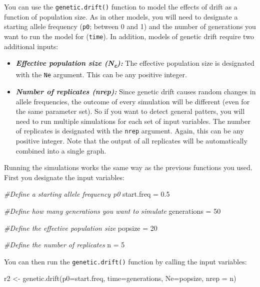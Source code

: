 \documentclass[
]{book}
\newenvironment{Shaded}{\begin{snugshade}}{\end{snugshade}}
\newcommand{\AttributeTok}[1]{\textcolor[rgb]{0.77,0.63,0.00}{#1}}
\newcommand{\CommentTok}[1]{\textcolor[rgb]{0.56,0.35,0.01}{\textit{#1}}}
\newcommand{\DecValTok}[1]{\textcolor[rgb]{0.00,0.00,0.81}{#1}}
\newcommand{\FloatTok}[1]{\textcolor[rgb]{0.00,0.00,0.81}{#1}}
\newcommand{\FunctionTok}[1]{\textcolor[rgb]{0.00,0.00,0.00}{#1}}
\newcommand{\NormalTok}[1]{#1}
\newcommand{\OtherTok}[1]{\textcolor[rgb]{0.56,0.35,0.01}{#1}}
\begin{document}
You can use the \texttt{genetic.drift()} function to model the effects of drift as a function of population size. As in other models, you will need to designate a starting allele frequency (\texttt{p0}; between 0 and 1) and the number of generations you want to run the model for (\texttt{time}). In addition, models of genetic drift require two additional inputs:

\begin{itemize}
\item
  \textbf{\emph{Effective population size (N\textsubscript{e}):}} The effective population size is designated with the \texttt{Ne} argument. This can be any positive integer.
\item
  \textbf{\emph{Number of replicates (nrep):}} Since genetic drift causes random changes in allele frequencies, the outcome of every simulation will be different (even for the same parameter set). So if you want to detect general patters, you will need to run multiple simulations for each set of input variables. The number of replicates is designated with the \texttt{nrep} argument. Again, this can be any positive integer. Note that the output of all replicates will be automatically combined into a single graph.
\end{itemize}

Running the simulations works the same way as the previous functions you used. First you designate the input variables:

\begin{Shaded}
\begin{Highlighting}[]
\CommentTok{\#Define a starting allele frequency p0}
\NormalTok{start.freq }\OtherTok{=} \FloatTok{0.5}

\CommentTok{\#Define how many generations you want to simulate}
\NormalTok{generations }\OtherTok{=} \DecValTok{50}

\CommentTok{\#Define the effective population size}
\NormalTok{popsize }\OtherTok{=} \DecValTok{20}

\CommentTok{\#Define the number of replicates}
\NormalTok{n }\OtherTok{=} \DecValTok{5}
\end{Highlighting}
\end{Shaded}

You can then run the \texttt{genetic.drift()} function by calling the input variables:

\begin{Shaded}
\begin{Highlighting}[]
\NormalTok{r2 }\OtherTok{\textless{}{-}} \FunctionTok{genetic.drift}\NormalTok{(}\AttributeTok{p0=}\NormalTok{start.freq, }\AttributeTok{time=}\NormalTok{generations, }\AttributeTok{Ne=}\NormalTok{popsize, }\AttributeTok{nrep =}\NormalTok{ n)}
\end{Highlighting}
\end{Shaded}
\end{document}
